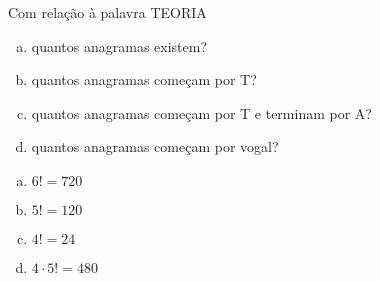 \begin{ex}
 Com relação à palavra TEORIA
    \begin{enumerate}[(a)]
    \item quantos anagramas existem?
    \item quantos anagramas começam por T?
    \item quantos anagramas começam por T e terminam por A?
    \item quantos anagramas começam por vogal?
    \end{enumerate}
       \begin{sol}
       \phantom{A}
          \begin{enumerate} [(a)]
              \item $6!=720$
              \item $5!=120$
              \item $4!=24$
              \item $4\cdot5!=480$
          \end{enumerate}
       \end{sol}
\end{ex}